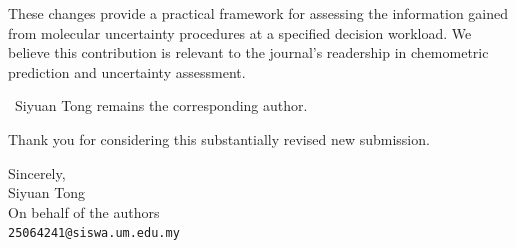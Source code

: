 These changes provide a practical framework for assessing the information gained from molecular uncertainty procedures at a specified decision workload. We believe this contribution is relevant to the journal's readership in chemometric prediction and uncertainty assessment.

\equalcontribution\ Siyuan Tong remains the corresponding author.

Thank you for considering this substantially revised new submission.

\noindent Sincerely,\\
Siyuan Tong\\
On behalf of the authors\\
\texttt{25064241@siswa.um.edu.my}

